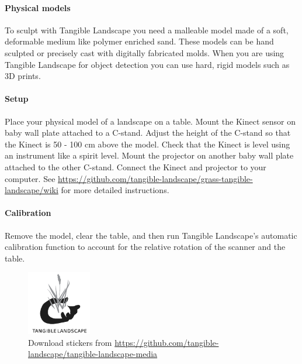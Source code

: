 \documentclass[prodmode,acmtochi]{acmsmall} %
\begin{document}
\paragraph{Physical models}
To sculpt with Tangible Landscape you need a malleable model 
made of a soft, deformable medium like polymer enriched sand. 
These models can be hand sculpted or precisely cast with digitally fabricated molds.
When you are using Tangible Landscape for object detection 
you can use hard, rigid models such as 3D prints. 

\paragraph{Setup}
Place your physical model of a landscape on a table. 
Mount the Kinect sensor on baby wall plate attached to a C-stand. 
Adjust the height of the C-stand so that the Kinect is 50 - 100 cm above the model. 
Check that the Kinect is level using an instrument like a spirit level.
Mount the projector on another baby wall plate attached to the other C-stand. 
Connect the Kinect and projector to your computer. 
See \url{https://github.com/tangible-landscape/grass-tangible-landscape/wiki}
for more detailed instructions.


\paragraph{Calibration}
Remove the model, clear the table, and then
run Tangible Landscape's automatic calibration function
to account for the relative rotation of the scanner and the table.

\begin{figure}
\begin{center}
	\includegraphics[width=0.25\textwidth]{images/tl_logo.pdf}
	\caption{Download stickers from \url{https://github.com/tangible-landscape/tangible-landscape-media}}
	\label{fig:stickers}
\end{center}
\end{figure}
\end{document}

